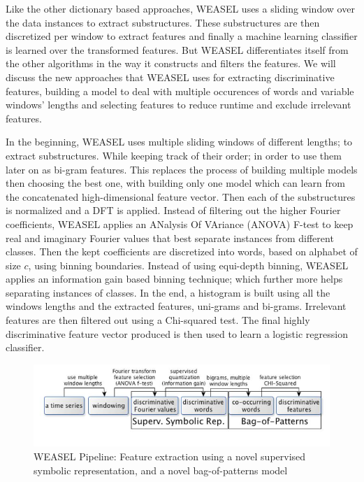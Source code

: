 Like the other dictionary based approaches, WEASEL uses a sliding window over the data instances to extract substructures.
These substructures are then discretized per window to extract features and finally a machine learning classifier is learned over the transformed features.
But WEASEL differentiates itself from the other algorithms in the way it constructs and filters the features.
We will discuss the new approaches that WEASEL uses for extracting discriminative features, building a model to deal with multiple occurences of words and variable windows' lengths
and selecting features to reduce runtime and exclude irrelevant features.

In the beginning, WEASEL uses multiple sliding windows of different lengths; to extract substructures.
While keeping track of their order; in order to use them later on as bi-gram features.
This replaces the process of building multiple models then choosing the best one, with building only one model which can learn from the concatenated high-dimensional feature vector.
Then each of the substructures is normalized and a DFT is applied.
Instead of filtering out the higher Fourier coefficients, WEASEL applies an ANalysis Of VAriance (ANOVA) F-test to keep real and imaginary Fourier values that best separate instances from different classes.
Then the kept coefficients are discretized into words, based on alphabet of size $c$, using binning boundaries. Instead of using equi-depth binning, WEASEL applies an information gain based
binning technique; which further more helps separating instances of classes.
In the end, a histogram is built using all the windows lengths and the extracted features, uni-grams and bi-grams.
Irrelevant features are then filtered out using a Chi-squared test. The final highly discriminative feature vector produced is then used to learn a logistic regression classifier.

\begin{figure}[!htbp]
    \captionsetup{justification=raggedright}
    \centering
    \includegraphics[scale = 0.5]{WEASELFlow.JPG}
    \centering
    \caption{WEASEL Pipeline: Feature extraction using a novel supervised symbolic representation, and a novel bag-of-patterns model \cite{schafer2017fast}}
    \label{Img:WEASELFlow}
\end{figure}

